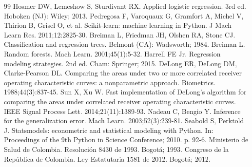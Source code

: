 \documentclass[twocolumn,10pt]{article}
\begin{document}
\begin{thebibliography}{99}
 Hosmer DW, Lemeshow S, Sturdivant RX. Applied logistic regression. 3rd ed. Hoboken (NJ): Wiley; 2013.
 Pedregosa F, Varoquaux G, Gramfort A, Michel V, Thirion B, Grisel O, et al. Scikit-learn: machine learning in Python. J Mach Learn Res. 2011;12:2825-30.
 Breiman L, Friedman JH, Olshen RA, Stone CJ. Classification and regression trees. Belmont (CA): Wadsworth; 1984.
 Breiman L. Random forests. Mach Learn. 2001;45(1):5-32.
 Harrell FE Jr. Regression modeling strategies. 2nd ed. Cham: Springer; 2015.
 DeLong ER, DeLong DM, Clarke-Pearson DL. Comparing the areas under two or more correlated receiver operating characteristic curves: a nonparametric approach. Biometrics. 1988;44(3):837-45.
 Sun X, Xu W. Fast implementation of DeLong's algorithm for comparing the areas under correlated receiver operating characteristic curves. IEEE Signal Process Lett. 2014;21(11):1389-93.
 Nadeau C, Bengio Y. Inference for the generalization error. Mach Learn. 2003;52(3):239-81.
 Seabold S, Perktold J. Statsmodels: econometric and statistical modeling with Python. In: Proceedings of the 9th Python in Science Conference; 2010. p. 92-6.
 Ministerio de Salud de Colombia. Resoluci\'on 8430 de 1993. Bogot\'a; 1993.
 Congreso de la Rep\'ublica de Colombia. Ley Estatutaria 1581 de 2012. Bogot\'a; 2012.
\end{thebibliography}
\end{document}
